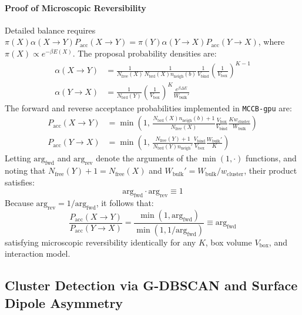 \documentclass[final,5p,times,twocolumn]{elsarticle}
\begin{document}
\paragraph{Proof of Microscopic Reversibility}
Detailed balance requires $\pi(X) \alpha(X \to Y) P_{\text{acc}}(X \to Y) = \pi(Y) \alpha(Y \to X) P_{\text{acc}}(Y \to X)$, where $\pi(X) \propto e^{-\beta E(X)}$. The proposal probability densities are:
\begin{align}
    \alpha(X \to Y) &= \frac{1}{N_{\text{free}}(X)} \frac{1}{N_{\text{brd}}(X) n_{\text{neigh}}(b)} \frac{1}{V_{\text{bind}}} \left(\frac{1}{V_{\text{box}}}\right)^{K-1} \\
    \alpha(Y \to X) &= \frac{1}{N_{\text{brd}}(Y)} \left(\frac{1}{V_{\text{box}}}\right)^K \frac{e^{\beta \Delta E}}{W_{\text{bulk}}'}
\end{align}
The forward and reverse acceptance probabilities implemented in \texttt{MCCB-gpu} are:
\begin{align}
    P_{\text{acc}}(X \to Y) &= \min\left(1, \, \frac{N_{\text{brd}}(X) n_{\text{neigh}}(b) + 1}{N_{\text{free}}(X)} \frac{V_{\text{box}}}{V_{\text{bind}}} \frac{K w_{\text{cluster}}}{W_{\text{bulk}}}\right) \label{eq:avbmc_acc_fwd} \\
    P_{\text{acc}}(Y \to X) &= \min\left(1, \, \frac{N_{\text{free}}(Y) + 1}{N_{\text{brd}}(Y) n_{\text{neigh}}'} \frac{V_{\text{bind}}}{V_{\text{box}}} \frac{W_{\text{bulk}}'}{K}\right) \label{eq:avbmc_acc_rev}
\end{align}
Letting $\text{arg}_{\text{fwd}}$ and $\text{arg}_{\text{rev}}$ denote the arguments of the $\min(1, \cdot)$ functions, and noting that $N_{\text{free}}(Y) + 1 = N_{\text{free}}(X)$ and $W_{\text{bulk}}' = W_{\text{bulk}} / w_{\text{cluster}}$, their product satisfies:
\begin{equation}
    \text{arg}_{\text{fwd}} \cdot \text{arg}_{\text{rev}} \equiv 1
    \label{eq:avbmc_invariant}
\end{equation}
Because $\text{arg}_{\text{rev}} = 1 / \text{arg}_{\text{fwd}}$, it follows that:
\begin{equation}
    \frac{P_{\text{acc}}(X \to Y)}{P_{\text{acc}}(Y \to X)} = \frac{\min(1, \text{arg}_{\text{fwd}})}{\min(1, 1/\text{arg}_{\text{fwd}})} \equiv \text{arg}_{\text{fwd}}
\end{equation}
satisfying microscopic reversibility identically for any $K$, box volume $V_{\text{box}}$, and interaction model.

\subsection{Cluster Detection via G-DBSCAN and Surface Dipole Asymmetry}
\label{sec:algo_dbscan}
\end{document}
